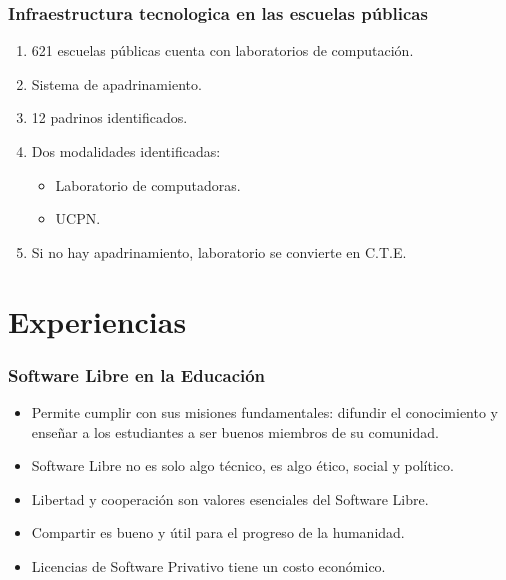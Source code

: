 \documentclass{beamer}
\begin{document}
\begin{frame}
\frametitle{Infraestructura tecnologica en las escuelas p\'ublicas}
	\begin{enumerate}
		\pause \item 621 escuelas p\'ublicas cuenta con laboratorios de computación.
		\pause \item Sistema de apadrinamiento.
		\pause \item 12 padrinos identificados.
		\pause \item Dos modalidades identificadas:
			\begin{itemize} 
				\item Laboratorio de computadoras.
				\item UCPN.
			\end{itemize}
		\pause \item Si no hay apadrinamiento, laboratorio se convierte en C.T.E.
	\end{enumerate}
\end{frame}


\section{Experiencias}

\begin{frame}
\frametitle{Software Libre en la Educaci\'on}
             \begin{itemize}
		\pause \item Permite cumplir con sus misiones fundamentales: \alert{difundir} el conocimiento y ense\~nar a los estudiantes a ser \alert{buenos miembros} de su comunidad. 
		\pause \item Software Libre no es solo algo t\'ecnico, es algo \alert{\'etico}, social y pol\'itico.
		\pause \item \alert{Libertad} y cooperaci\'on son valores esenciales del Software Libre.
		\pause \item \alert{Compartir} es bueno y \'util para el progreso de la humanidad.
		\pause \item Licencias de Software Privativo tiene un costo econ\'omico.
	     \end{itemize}

\end{frame}
\end{document}
